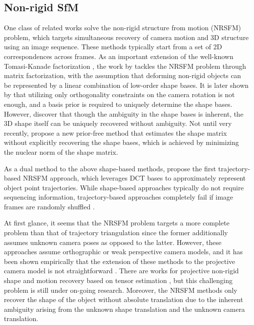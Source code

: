 \subsection{Non-rigid SfM}
One class of related works solve the non-rigid structure from motion (NRSFM) problem, which targets simultaneous recovery of camera motion and 3D structure using an image sequence. These methods typically start from a set of 2D correspondences across frames. 
As an important extension of the well-known Tomasi-Kanade factorization \cite{tomasi1992shape}, 
the work by \citet{Bregler_CVPR2000} tackles the NRSFM problem through matrix factorization, with the assumption that deforming non-rigid objects can be represented by a linear combination of low-order shape bases. 
It is later shown by \citet{Xiao_ECCV2004} that utilizing only orthogonality constraints on the camera rotation is not enough, and a basis prior is required to uniquely determine the shape bases.
However, \citet{akhter2009defense} discover that though the ambiguity in the shape bases is inherent, the 3D shape itself can be uniquely recovered without ambiguity.
Not until very recently, \cite{dai2014simple} propose a new prior-free method that estimates the shape matrix without explicitly recovering the shape bases, which is achieved by minimizing the nuclear norm of the shape matrix.

As a dual method to the above shape-based methods, \citet{Akhter_NIPS08} propose the first trajectory-based NRSFM approach, which leverages DCT bases to approximately represent object point trajectories.
While shape-based approaches typically do not require sequencing information,  trajectory-based approaches completely fail if image frames are randomly shuffled \cite{dai2014simple}.

At first glance, it seems that the NRSFM problem targets a more complete problem than that of trajectory triangulation since the former additionally assumes unknown camera poses as opposed to the latter.
However, these approaches assume orthographic or weak perspective camera models, and it has been shown empirically that the extension of these methods to the projective camera model is not straightforward \cite{Park_ECCV2010}. There are works for projective non-rigid shape and motion recovery based on tensor estimation \cite{hartley2008perspective,vidal2006nonrigid}, but this challenging problem is still under on-going research. Moreover, the NRSFM methods only recover the shape of the object without absolute translation due to the inherent ambiguity arising from the unknown shape translation and the unknown camera translation. 

